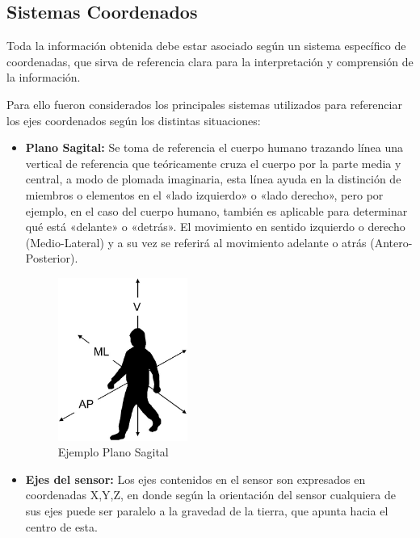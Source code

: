 \documentclass[12pt,a4paper]{article}
\begin{document}
			\subsection{Sistemas Coordenados}
			Toda la información obtenida debe estar asociado según un sistema específico de coordenadas, que sirva de referencia clara para la interpretación y comprensión de la información.
			
			Para ello fueron considerados los principales sistemas utilizados para referenciar los ejes coordenados según los distintas situaciones:
			\begin{itemize}
				
				\item \textbf{Plano Sagital:} Se toma de referencia el cuerpo humano trazando línea una  vertical de referencia que teóricamente cruza el cuerpo por la parte media y central, a modo de plomada imaginaria, esta línea ayuda en la distinción de miembros o elementos en el «lado izquierdo» o «lado derecho», pero por ejemplo, en el caso del cuerpo humano, también es aplicable para determinar qué está «delante» o «detrás». El movimiento en sentido izquierdo o derecho (Medio-Lateral) y a su vez se referirá al movimiento adelante o atrás (Antero-Posterior).
					\begin{figure}[H]
						\centering
						\includegraphics[width=0.4\textwidth]{images/sagital}
						\caption{Ejemplo Plano Sagital}
						\label{fig:sagital}
					\end{figure}
				
				\item \textbf{Ejes del sensor:} Los ejes contenidos en el sensor son expresados en coordenadas X,Y,Z, en donde según la orientación del sensor cualquiera de sus ejes puede ser paralelo a la gravedad de la tierra, que apunta hacia el centro de esta.
			\end{itemize}
			
\end{document}
